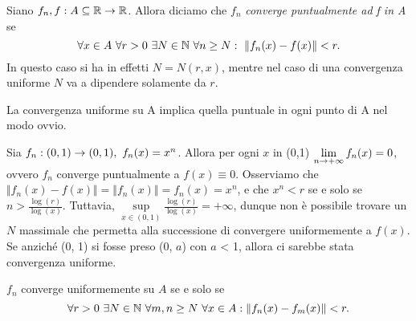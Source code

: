 \documentclass[Completo.tex]{subfiles}
\begin{document}
\begin{Def}
	Siano $f_n, f: A \sseq \bb[R] \ra \bb[R]$. Allora diciamo che $f_n$ \textit{converge puntualmente ad f in A} se
	\begin{equation*}
	\forall x \in A \ \forall r > 0 \ \exists N \in \bb[N] \ \forall n \geq N: \ \Vert f_n(x) - f(x) \Vert < r.
	\end{equation*}
	In questo caso si ha in effetti $N = N(r, x)$, mentre nel caso di una convergenza uniforme $N$ va a dipendere solamente da $r$.
\end{Def}
\begin{Oss}
	La convergenza uniforme su A implica quella puntuale in ogni punto di A nel modo ovvio.
\end{Oss}
\begin{Ex}
	Sia $f_n: (0, 1) \rightarrow (0, 1), \ f_n(x) = x^n$. Allora per ogni $x$ in (0,1) $\lim\limits_{n \rightarrow +\infty} f_n(x) = 0$, ovvero $f_n$ converge puntualmente a $f(x) \equiv 0$. Osserviamo che $\Vert f_n(x) - f(x)\Vert = \Vert f_n(x)\Vert = f_n(x) = x^n$, e che $x^n < r$ se e solo se $n > \frac{\log(r)}{\log(x)}$. Tuttavia, $\sup\limits_{x \in (0, 1)} \frac{\log(r)}{\log(x)} = +\infty$, dunque non è possibile trovare un $N$ massimale che permetta alla successione di convergere uniformemente a $f(x)$. Se anziché (0, 1) si fosse preso (0, $a$) con $a$ < 1, allora ci sarebbe stata convergenza uniforme. 
\end{Ex}
\begin{Th}
	$f_n$ converge uniformemente su $A$ se e solo se
	\begin{equation*}
	\forall r > 0 \ \exists N \in \bb[N] \ \forall m, n \geq N \ \forall x \in A: \Vert f_n(x) - f_m(x)\Vert < r.
	\end{equation*}
\end{Th}
\end{document}
